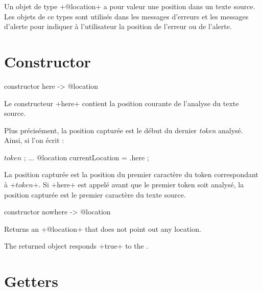 

Un objet de type \ggs+@location+ a pour valeur une position dans un texte source. Les objets de ce types sont utilisés dans les messages d'erreurs et les messages d'alerte pour indiquer à l'utilisateur la position de l'erreur ou de l'alerte.











\section{Constructor}



\begin{galgas}
constructor here -> @location
\end{galgas}

Le constructeur \ggs+here+ contient la position courante de l'analyse du texte source.

Plus précisément, la position capturée est le début du dernier \emph{token} analysé. Ainsi, si l'on écrit :

\begin{galgas}
  $token$ ;
  ...
  @location currentLocation = .here ;
\end{galgas}

La position capturée est la position du premier caractère du token correspondant à \ggs+$token$+. Si \ggs+here+ est appelé avant que le premier token soit analysé, la position capturée est le premier caractère du texte source.







\begin{galgas}
constructor nowhere -> @location
\end{galgas}


Returns an \ggs+@location+ that does not point out any location.

The returned object responds \ggs+true+ to the .

\section{Getters}

